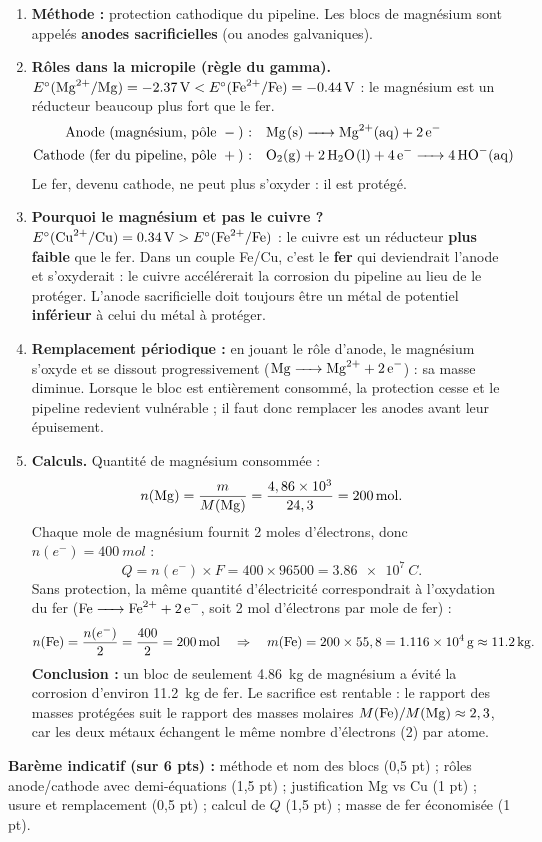 \documentclass[11pt]{article}
\newcommand{\cle}[1]{{\popxbold\color{popdark}#1}}
\begin{document}
\begin{corrige}
\begin{enumerate}
\item \textbf{Méthode :} \cle{protection cathodique} du pipeline. Les blocs de magnésium sont appelés \textbf{anodes sacrificielles} (ou anodes galvaniques).
\item \textbf{Rôles dans la micropile (règle du gamma).} $E^\circ(\ce{Mg^2+}/\ce{Mg}) = \SI{-2,37}{V} < E^\circ(\ce{Fe^2+}/\ce{Fe}) = \SI{-0,44}{V}$ : le magnésium est un réducteur beaucoup plus fort que le fer.
\begin{align*}
\text{Anode (magnésium, pôle } - \text{) :}\quad & \ce{Mg(s) -> Mg^2+(aq) + 2e-} \\
\text{Cathode (fer du pipeline, pôle } + \text{) :}\quad & \ce{O2(g) + 2H2O(l) + 4e- -> 4HO-(aq)}
\end{align*}
Le fer, devenu cathode, ne peut plus s'oxyder : il est protégé.
\item \textbf{Pourquoi le magnésium et pas le cuivre ?} $E^\circ(\ce{Cu^2+}/\ce{Cu}) = \SI{+0,34}{V} > E^\circ(\ce{Fe^2+}/\ce{Fe})$ : le cuivre est un réducteur \textbf{plus faible} que le fer. Dans un couple Fe/Cu, c'est le \textbf{fer} qui deviendrait l'anode et s'oxyderait : le cuivre accélérerait la corrosion du pipeline au lieu de le protéger. L'anode sacrificielle doit toujours être un métal de potentiel \textbf{inférieur} à celui du métal à protéger.
\item \textbf{Remplacement périodique :} en jouant le rôle d'anode, le magnésium s'oxyde et se dissout progressivement ($\ce{Mg -> Mg^2+ + 2e-}$) : sa masse diminue. Lorsque le bloc est entièrement consommé, la protection cesse et le pipeline redevient vulnérable ; il faut donc remplacer les anodes avant leur épuisement.
\item \textbf{Calculs.} Quantité de magnésium consommée :
\[ n(\ce{Mg}) = \frac{m}{M(\ce{Mg})} = \frac{4,86\times 10^{3}}{24,3} = \SI{200}{mol}. \]
Chaque mole de magnésium fournit 2 moles d'électrons, donc $n(e^-) = \SI{400}{mol}$ :
\[ Q = n(e^-) \times F = 400 \times 96500 = \SI{3,86e7}{C}. \]
Sans protection, la même quantité d'électricité correspondrait à l'oxydation du fer ($\ce{Fe -> Fe^2+ + 2e-}$, soit 2 mol d'électrons par mole de fer) :
\[ n(\ce{Fe}) = \frac{n(e^-)}{2} = \frac{400}{2} = \SI{200}{mol} \quad\Rightarrow\quad m(\ce{Fe}) = 200 \times 55,8 = \SI{1,116e4}{g} \approx \SI{11,2}{kg}. \]
\textbf{Conclusion :} un bloc de seulement \SI{4,86}{kg} de magnésium a évité la corrosion d'environ \SI{11,2}{kg} de fer. Le sacrifice est rentable : le rapport des masses protégées suit le rapport des masses molaires $M(\ce{Fe})/M(\ce{Mg}) \approx 2,3$, car les deux métaux échangent le même nombre d'électrons (2) par atome.
\end{enumerate}
\textbf{Barème indicatif (sur 6 pts) :} méthode et nom des blocs (0,5 pt) ; rôles anode/cathode avec demi-équations (1,5 pt) ; justification Mg vs Cu (1 pt) ; usure et remplacement (0,5 pt) ; calcul de $Q$ (1,5 pt) ; masse de fer économisée (1 pt).
\end{corrige}
\end{document}
